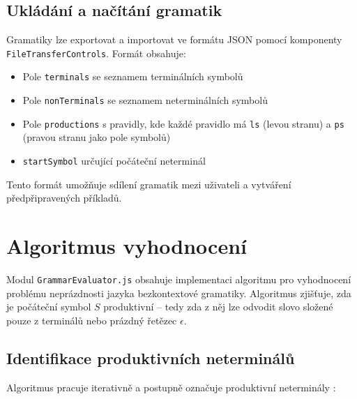\subsection{Ukládání a načítání gramatik}
\label{sec:GrammarsSerialization}

Gramatiky lze exportovat a importovat ve formátu JSON pomocí komponenty \texttt{FileTransferControls}. Formát obsahuje:

\begin{itemize}
    \item Pole \texttt{terminals} se seznamem terminálních symbolů
    \item Pole \texttt{nonTerminals} se seznamem neterminálních symbolů
    \item Pole \texttt{productions} s pravidly, kde každé pravidlo má \texttt{ls} (levou stranu) a \texttt{ps} (pravou stranu jako pole symbolů)
    \item \texttt{startSymbol} určující počáteční neterminál
\end{itemize}

Tento formát umožňuje sdílení gramatik mezi uživateli a vytváření předpřipravených příkladů.



\section{Algoritmus vyhodnocení}
\label{sec:GrammarsAlgorithm}

Modul \texttt{GrammarEvaluator.js} obsahuje implementaci algoritmu pro vyhodnocení problému neprázdnosti jazyka bezkontextové gramatiky. Algoritmus zjišťuje, zda je počáteční symbol \( S \) produktivní – tedy zda z něj lze odvodit slovo složené pouze z terminálů nebo prázdný řetězec \( \epsilon \).

\subsection{Identifikace produktivních neterminálů}
\label{sec:GrammarsProductive}

Algoritmus pracuje iterativně a postupně označuje produktivní neterminály \cite{sawa}:

